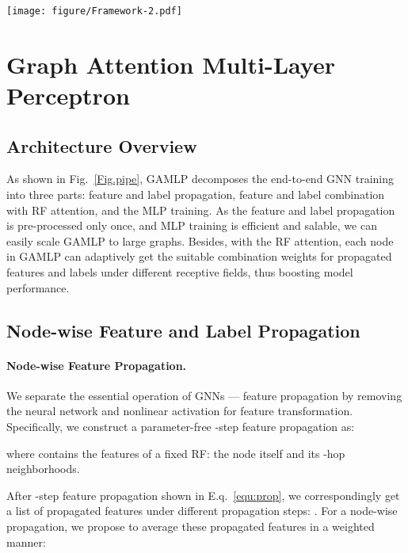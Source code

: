 \documentclass[sigconf]{acmart}
\begin{document}
\begin{figure*}[tpb]
    \centering
    \hspace{22.5mm}
    \texttt{[image: figure/Framework-2.pdf]}
    \vspace{-2mm}
    \caption{Overview of the proposed GAMLP, including (1) feature and label propagation, (2) combine the propagated features and labels with RF attention, and (3) MLP training. Note that both the feature and label propagation can be pre-processed.
}  
     \vspace{-2mm}
    \label{Fig.pipe}
\end{figure*}

\section{Graph Attention Multi-Layer Perceptron}
\label{sec4}
\subsection{Architecture Overview}
As shown in Fig.~\ref{Fig.pipe}, GAMLP decomposes the end-to-end GNN training into three parts: feature and label propagation, feature and label combination with RF attention, and the MLP training. 
As the feature and label propagation is pre-processed only once, and MLP training is efficient and salable, we can easily scale GAMLP to large graphs. Besides, with the RF attention, each node in GAMLP can adaptively get the suitable combination weights for propagated features and labels under different receptive fields, thus boosting model performance.

\subsection{Node-wise Feature and Label Propagation}  
\label{NFP}
\noindent\paragraph{\textbf{Node-wise Feature Propagation.}} We separate the essential operation of GNNs — feature propagation by removing the neural network  and nonlinear activation  for feature transformation. 
Specifically, we construct a parameter-free -step feature propagation as:

where  contains the features of a fixed RF: the node itself and its -hop neighborhoods. 

After -step feature propagation shown in E.q.~\ref{equ:prop}, we correspondingly get a list of propagated features under different propagation steps: .
For a node-wise propagation, we propose to average these propagated features in a weighted manner:
\end{document}
